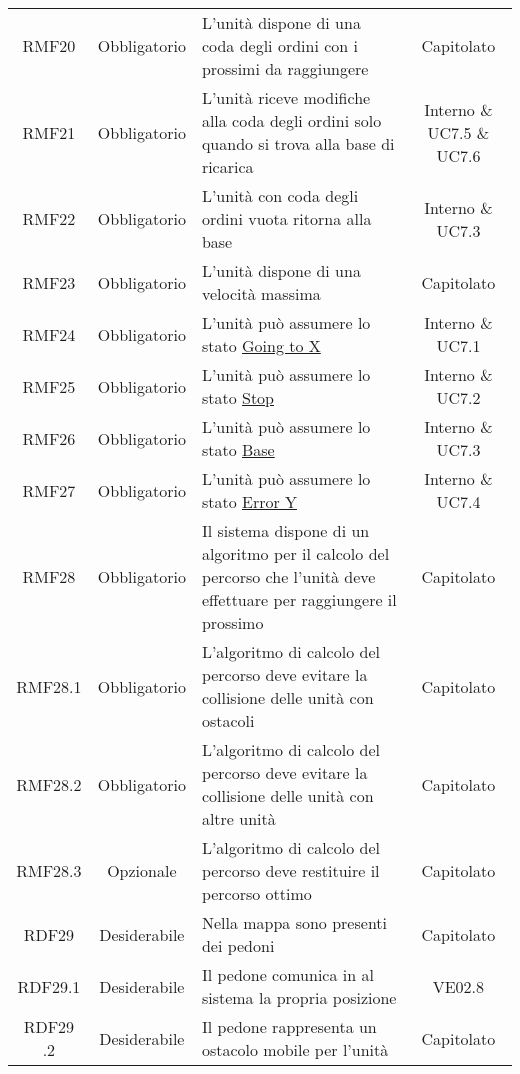 \begin{longtable}[h!] { c c m{8cm} c}
		RMF20 & Obbligatorio & L'unità dispone di una coda degli ordini con i prossimi \glock{POI} da raggiungere & Capitolato \\

		RMF21 & Obbligatorio & L'unità riceve modifiche alla coda degli ordini solo quando si trova alla base di ricarica & Interno \& UC7.5 \& UC7.6 \\

		RMF22 & Obbligatorio & L'unità con coda degli ordini vuota ritorna alla base & Interno \& UC7.3 \\

		RMF23 & Obbligatorio & L'unità dispone di una velocità massima & Capitolato \\

		RMF24 & Obbligatorio & L'unità può assumere lo stato \underline{Going to X} & Interno \& UC7.1 \\

		RMF25 & Obbligatorio & L'unità può assumere lo stato \underline{Stop} & Interno \& UC7.2 \\

		RMF26 & Obbligatorio & L'unità può assumere lo stato \underline{Base} & Interno \& UC7.3 \\

		RMF27 & Obbligatorio & L'unità può assumere lo stato \underline{Error Y} & Interno \& UC7.4 \\

		RMF28 & Obbligatorio & Il sistema dispone di un algoritmo per il calcolo del percorso che l'unità deve effettuare per raggiungere il prossimo \glock{POI} & Capitolato \\

		RMF28.1 & Obbligatorio & L'algoritmo di calcolo del percorso deve evitare la collisione delle unità con ostacoli & Capitolato \\

		RMF28.2 & Obbligatorio & L'algoritmo di calcolo del percorso deve evitare la collisione delle unità con altre unità & Capitolato \\

		RMF28.3 & Opzionale & L'algoritmo di calcolo del percorso deve restituire il percorso ottimo & Capitolato \\

		RDF29 & Desiderabile & Nella mappa sono presenti dei pedoni & Capitolato \\

		RDF29.1 & Desiderabile & Il pedone comunica in \glock{real-time} al sistema la propria posizione & VE02.8 \\

		RDF29 .2 & Desiderabile & Il pedone rappresenta un ostacolo mobile per l'unità & Capitolato \\

	\end{longtable}

